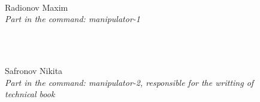 \begin{figure}[H]
\begin{minipage}[h]{0.47\linewidth}
		\\
		Radionov Maxim\\
		\emph{Part in the command: manipulator-1}
	\end{minipage}
	\center  
	\center  
	\vfill 
	\begin{minipage}[h]{0.47\linewidth}
		\\
		Safronov Nikita\\
		\emph{Part in the command: manipulator-2, responsible for the writting of technical book}
	\end{minipage}
	\hfill
	\begin{minipage}[h]{0.47\linewidth}

\end{minipage}
\end{figure}
